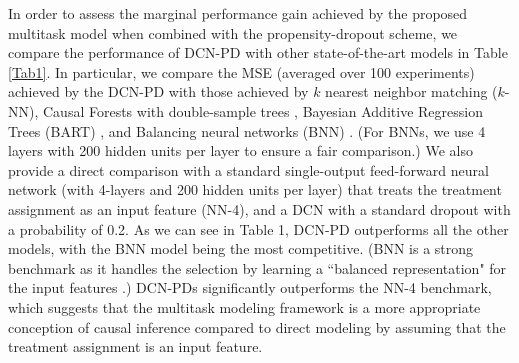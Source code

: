 \documentclass{article}
\begin{document}
In order to assess the marginal performance gain achieved by the proposed multitask model when combined with the propensity-dropout scheme, we compare the performance of DCN-PD with other state-of-the-art models in Table \ref{Tab1}. In particular, we compare the MSE (averaged over 100 experiments) achieved by the DCN-PD with those achieved by $k$ nearest neighbor matching ($k$-NN), Causal Forests with double-sample trees \cite{wager2015estimation}, Bayesian Additive Regression Trees (BART) \cite{chipman2010bart, hill2012bayesian}, and Balancing neural networks (BNN) \cite{johansson2016learning}. (For BNNs, we use 4 layers with 200 hidden units per layer to ensure a fair comparison.) We also provide a direct comparison with a standard single-output feed-forward neural network (with 4-layers and 200 hidden units per layer) that treats the treatment assignment as an input feature (NN-4), and a DCN with a standard dropout with a probability of 0.2. As we can see in Table 1, DCN-PD outperforms all the other models, with the BNN model being the most competitive. (BNN is a strong benchmark as it handles the selection by learning a ``balanced representation" for the input features \cite{johansson2016learning}.) DCN-PDs significantly outperforms the NN-4 benchmark, which suggests that the multitask modeling framework is a more appropriate conception of causal inference compared to direct modeling by assuming that the treatment assignment is an input feature. 
\newpage
\nocite{*}


\end{document}

